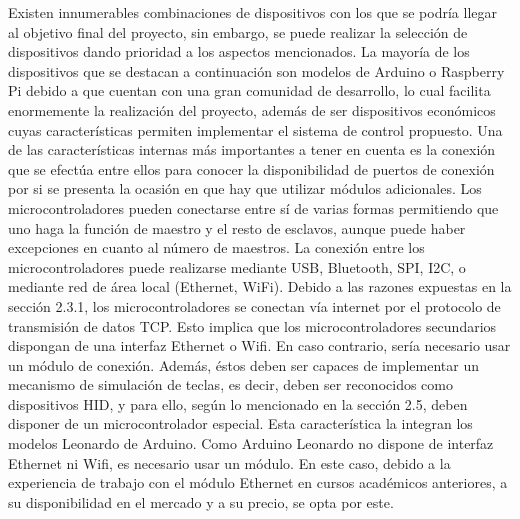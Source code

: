 Existen innumerables combinaciones de dispositivos con los que se podría llegar al objetivo final del proyecto, sin embargo, se puede realizar la selección de dispositivos dando prioridad a los aspectos mencionados. La mayoría de los dispositivos que se destacan a continuación son modelos de Arduino o Raspberry Pi debido a que cuentan con una gran comunidad de desarrollo, lo cual facilita enormemente la realización del proyecto, además de ser dispositivos económicos cuyas características permiten implementar el sistema de control propuesto. Una de las características internas más importantes a tener en cuenta es la conexión que se efectúa entre ellos para conocer la disponibilidad de puertos de conexión por si se presenta la ocasión en que hay que utilizar módulos adicionales. Los microcontroladores pueden conectarse entre sí de varias formas permitiendo que uno haga la función de maestro y el resto de esclavos, aunque puede haber excepciones en cuanto al número de maestros. La conexión entre los microcontroladores puede realizarse mediante USB, Bluetooth, SPI, I2C, o mediante red de área local (Ethernet, WiFi). Debido a las razones expuestas en la sección 2.3.1, los microcontroladores se conectan vía internet por el protocolo de transmisión de datos TCP. Esto implica que los microcontroladores secundarios dispongan de una interfaz Ethernet o Wifi. En caso contrario, sería necesario usar un módulo de conexión. Además, éstos deben ser capaces de implementar un mecanismo de simulación de teclas, es decir, deben ser reconocidos como dispositivos HID, y para ello, según lo mencionado en la sección 2.5, deben disponer de un microcontrolador especial. Esta característica la integran los modelos Leonardo de Arduino. Como Arduino Leonardo no dispone de interfaz Ethernet ni Wifi, es necesario usar un módulo. En este caso, debido a la experiencia de trabajo con el módulo Ethernet en cursos académicos anteriores, a su disponibilidad en el mercado y a su precio, se opta por este.

